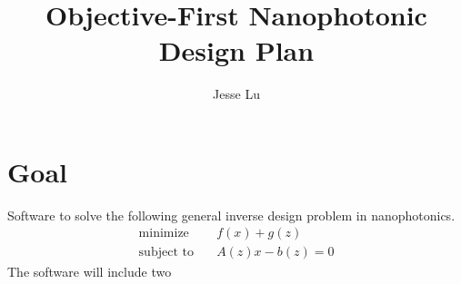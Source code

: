 \documentclass{article}
\title{Objective-First Nanophotonic Design Plan}
\author{Jesse Lu}
\newcommand{\E}[1]{\begin{subequations}\begin{align}#1\end{align}\end{subequations}}
\DeclareMathOperator*{\minimize}{\text{minimize}\quad}
\newcommand{\subto}{\text{subject to}\quad}
\begin{document}
\maketitle
\tableofcontents

\section{Goal}
    Software to solve the following general inverse design problem in nanophotonics.
    \E{ \minimize&  f(x) + g(z) \\
        \subto&     A(z)x - b(z) = 0}
    The software will include two 
\end{document}
